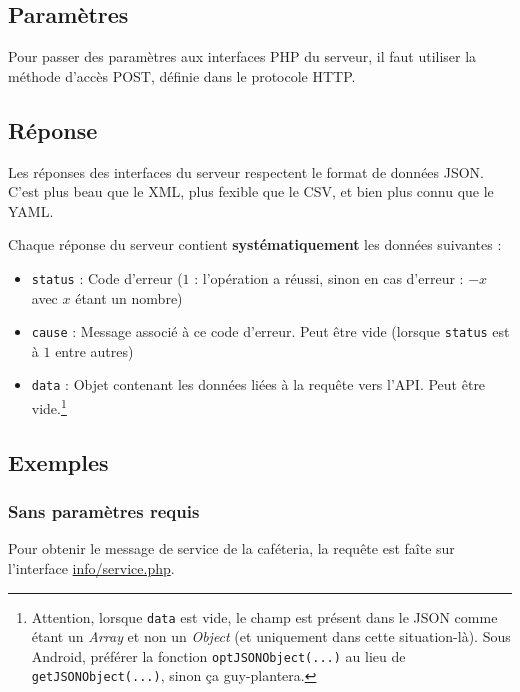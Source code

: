 \documentclass[12pt,a4paper,oneside]{report}
\begin{document}
\subsection{Paramètres}

Pour passer des paramètres aux interfaces PHP du serveur, il faut utiliser la méthode d'accès POST, définie dans le protocole HTTP.

\subsection{Réponse}

Les réponses des interfaces du serveur respectent le format de données JSON. C'est plus beau que le XML, plus fexible que le CSV, et bien plus connu que le YAML.

Chaque réponse du serveur contient \textbf{systématiquement} les données suivantes :

\begin{itemize}

\item \texttt{status} : Code d'erreur ($1$ : l'opération a réussi, sinon en cas d'erreur : $-x$ avec $x$ étant un nombre)

\item \texttt{cause} : Message associé à ce code d'erreur. Peut être vide (lorsque \texttt{status} est à $1$ entre autres)

\item \texttt{data} : Objet contenant les données liées à la requête vers l'API. Peut être vide.\footnote{Attention, lorsque \texttt{data} est vide, le champ est présent dans le JSON comme étant un \textit{Array} et non un \textit{Object} (et uniquement dans cette situation-là). Sous Android, préférer la fonction \texttt{optJSONObject(...)} au lieu de \texttt{getJSONObject(...)}, sinon ça guy-plantera.}

\end{itemize}

\subsection{Exemples}

\subsubsection{Sans paramètres requis}

Pour obtenir le message de service de la caféteria, la requête est faîte sur l'interface \url{info/service.php}.\\
\end{document}
